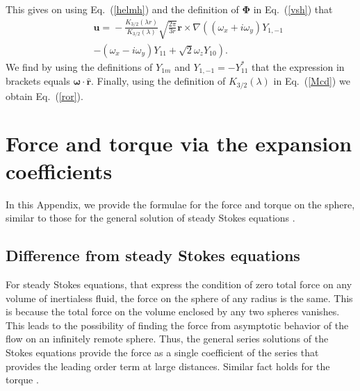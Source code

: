 \documentclass[aps,prx,twocolumn,amsmath,amssymb,amsfonts]{revtex4-2}
\begin{document}
{{\begin{appendices}
This gives on using Eq.~(\ref{helmh}) and the definition of $\bm \Phi$ in Eq.~(\ref{vsh}) that
\begin{eqnarray}&&
\bm u\!=\!-\frac{K_{3/2}(\lambda r)}{K_{3/2}(\lambda)}\sqrt{\frac{2\pi}{3r}}\bm r\!\times \!\nabla
\left( \left(\omega_x+i\omega_y\right)Y_{1, -1}
\right.\\&&\nonumber\left.
-(\omega_x-i \omega_y)Y_{11}+\sqrt{2}\omega_zY_{10}\right).
\end{eqnarray}
We find by using the definitions of $Y_{1m}$ and $Y_{1, -1}=-Y_{11}^*$ that the expression in brackets equals $\bm \omega\cdot\bm {\hat r}$. Finally, using the definition of $K_{3/2}(\lambda)$ in Eq.~(\ref{Mcd}) we obtain Eq.~(\ref{ror}).

\section{Force and torque via the expansion coefficients} \label{formulae}

In this Appendix, we provide the formulae for the force and torque on the sphere, similar to those for the general solution of steady Stokes equations \cite{kim}.

\subsection{Difference from steady Stokes equations}

For steady Stokes equations, that express the condition of zero total force on any volume of inertialess fluid, the force on the sphere of any radius is the same. This is because the total force on the volume enclosed by any two spheres vanishes. This leads to the possibility of finding the force from asymptotic behavior of the flow on an infinitely remote sphere. Thus, the general series solutions of the Stokes equations provide the force as a single coefficient of the series that provides the leading order term at large distances. Similar fact holds for the torque \cite{kim}.


\end{appendices}}}
\end{document}
